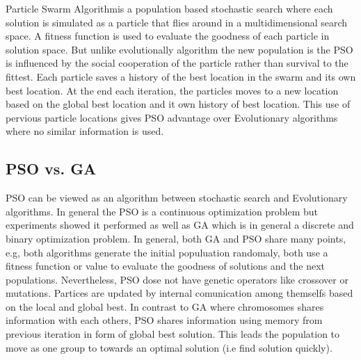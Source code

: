  Particle Swarm Algorithm\cite{PSOFirst}is a population based stochastic search where each solution is simulated as a  particle that flies around in a multidimensional search space. A fitness function is used to evaluate the goodness of each particle in solution space. But unlike evolutionally algorithm the new population is the PSO is influenced by the social cooperation of the particle rather than survival to the fittest. Each particle saves a history of the best location in the swarm and its own best location.  At the end each iteration, the particles moves to a new location based on the global best location and it own history of best location. This use of pervious particle locations gives PSO advantage over Evolutionary algorithms where no similar information is used. 
 
\subsection{PSO vs. GA}
 PSO can be viewed as an algorithm between stochastic search and Evolutionary algorithms\cite{PSOpattern}. In general the PSO is a continuous optimization problem but experiments showed it performed as well as GA which is in general a discrete and binary optimization problem. In general, both GA and PSO share many points, e.g, both algorithms generate the initial populuation randomaly, both use a fitness function or value to evaluate the goodness of solutions and the next populations. Nevertheless, PSO dose not have genetic operators like crossover or mutations. Partices are updated by internal comunication among themselfs based on the local and global best. In contrast to GA where chromosomes shares information with each others, PSO shares information using memory from previous iteration in form of global best solution. This leads the population to move as one group to towards an optimal solution (i.e find solution quickly). %
 


